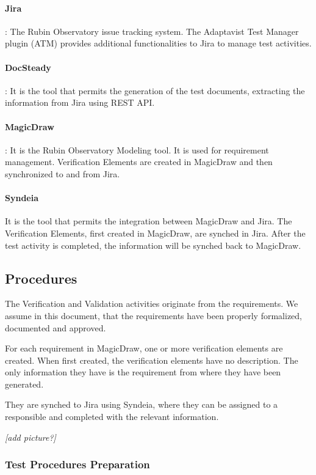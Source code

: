 \paragraph{Jira}:
The Rubin Observatory issue tracking system.
The Adaptavist Test Manager plugin (ATM) provides additional functionalities to Jira to manage test activities.

\paragraph{DocSteady}:
It is the tool that permits the generation of the test documents, extracting the information from Jira using REST API.

\paragraph{MagicDraw}:
It is the Rubin Observatory Modeling tool. It is used for requirement management. Verification Elements are created
in MagicDraw and then synchronized to and from Jira.

\paragraph{Syndeia}
It is the tool that permits the integration between MagicDraw and Jira. The Verification Elements, first created in MagicDraw,
are synched in Jira. After the test activity is completed, the information will be synched back to MagicDraw.


\subsection{Procedures}

The Verification and Validation activities originate from the requirements.
We assume in this document, that the requirements have been properly formalized, documented and approved.

For each requirement in MagicDraw, one or more verification elements are created.
When first created, the verification elements have no description. The only information they have is the requirement from where they have been generated.

They are synched to Jira using Syndeia, where they can be assigned to a responsible and completed with the relevant information.

\textit{[add picture?]}


\subsubsection{Test Procedures Preparation}


